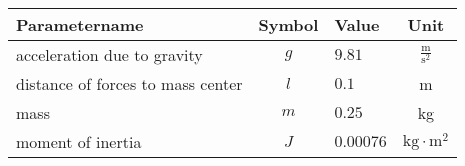 \begin{tabular}{lclc}
\hline
 Parametername                     &  Symbol  & Value     &               Unit                \\
\hline
 acceleration due to gravity       &   $g$    & $9.81$    & $\frac{\mathrm{m}}{\mathrm{s}^2}$ \\
 distance of forces to mass center &   $l$    & $0.1$     &                 m                 \\
 mass                              &   $m$    & $0.25$    &                kg                 \\
 moment of inertia                 &   $J$    & $0.00076$ & $\mathrm{kg} \cdot \mathrm{m}^2$  \\
\hline
\end{tabular}